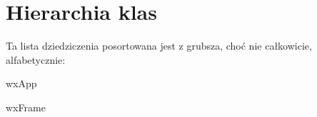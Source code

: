 \section{Hierarchia klas}
Ta lista dziedziczenia posortowana jest z grubsza, choć nie całkowicie, alfabetycznie\+:\begin{DoxyCompactList}
\item wx\+App\begin{DoxyCompactList}
\item {}
\end{DoxyCompactList}
\item wx\+Frame\begin{DoxyCompactList}
\item {}
\begin{DoxyCompactList}
\item {}
\end{DoxyCompactList}
\item {}
\begin{DoxyCompactList}
\item {}
\end{DoxyCompactList}
\end{DoxyCompactList}
\end{DoxyCompactList}

